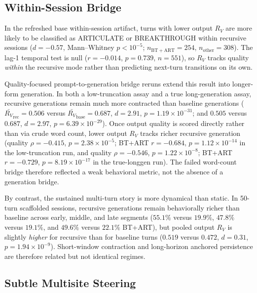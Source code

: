 \documentclass{article}
\newcommand{\RV}{R_V}
\newcommand{\dcohen}{d}
\begin{document}
\subsection{Within-Session Bridge}
\label{sec:bridge}

In the refreshed base within-session artifact, turns with lower output $\RV$ are more likely to be
classified as ARTICULATE or BREAKTHROUGH within recursive sessions
($\dcohen = -0.57$, Mann--Whitney $p < 10^{-5}$; $n_\mathrm{BT+ART}=254$,
$n_\mathrm{other}=308$).
The lag-1 temporal test is null ($r = -0.014$, $p = 0.739$, $n = 551$), so $\RV$
tracks quality \emph{within} the recursive mode rather than predicting next-turn transitions on its own.

Quality-focused prompt-to-generation bridge reruns extend this result into longer-form generation.
In both a low-truncation assay and a true long-generation assay, recursive generations remain much
more contracted than baseline generations
($\bar{\RV}_\mathrm{rec} = 0.506$ versus $\bar{\RV}_\mathrm{base} = 0.687$, $\dcohen = 2.91$,
$p = 1.19 \times 10^{-31}$; and $0.505$ versus $0.687$, $\dcohen = 2.97$,
$p = 6.39 \times 10^{-29}$).
Once output quality is scored directly rather than via crude word count, lower output $\RV$
tracks richer recursive generation
(quality $\rho = -0.415$, $p = 2.38 \times 10^{-5}$; BT+ART $r = -0.684$,
$p = 1.12 \times 10^{-14}$ in the low-truncation run, and
quality $\rho = -0.546$, $p = 1.22 \times 10^{-8}$; BT+ART $r = -0.729$,
$p = 8.19 \times 10^{-17}$ in the true-longgen run).
The failed word-count bridge therefore reflected a weak behavioral metric, not the absence of a
generation bridge.

By contrast, the sustained multi-turn story is more dynamical than static.
In 50-turn scaffolded sessions, recursive generations remain behaviorally richer than baseline
across early, middle, and late segments
($55.1\%$ versus $19.9\%$, $47.8\%$ versus $19.1\%$, and $49.6\%$ versus $22.1\%$ BT+ART),
but pooled output $\RV$ is slightly \emph{higher} for recursive than for baseline turns
($0.519$ versus $0.472$, $\dcohen = 0.31$, $p = 1.94 \times 10^{-9}$).
Short-window contraction and long-horizon anchored persistence are therefore related but not
identical regimes.

\subsection{Subtle Multisite Steering}
\label{sec:subtle_multisite}
\end{document}
